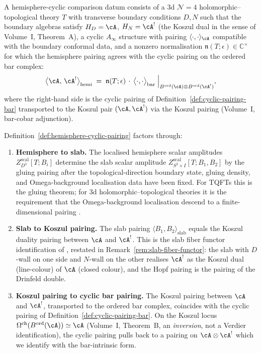 \begin{definition}
\label{def:hemisphere-cyclic-pairing}
A hemisphere-cyclic comparison datum consists of a $3$d
$\mathcal N=4$ holomorphic--topological theory \(T\)
with transverse boundary conditions $D,N$ such that the boundary
algebras satisfy $H_D = \cA$, $H_N = \cA^!$ (the Koszul dual in
the sense of Volume~I, Theorem~A), a
cyclic $A_\infty$ structure with pairing
$\langle\cdot,\cdot\rangle_\cA$ compatible with the boundary
conformal data, and a
nonzero normalisation $\mathfrak n(T;\epsilon)\in\mathbb C^\times$
for which the hemisphere pairing agrees with the cyclic pairing on
the ordered bar complex:
\[
 \bigl\langle \cA,\, \cA^!\bigr\rangle_{\mathrm{hemi}}
 \;=\;
 \mathfrak n(T;\epsilon)\,\cdot\,
 \bigl\langle\cdot,\cdot\bigr\rangle_{\mathrm{bar}}
 \;\Big|_{B^{\mathrm{ord}}(\cA)\otimes
 B^{\mathrm{ord}}(\cA^!)},
\]
where the right-hand side is the cyclic pairing of
Definition~\ref{def:cyclic-pairing-bar} transported to the
Koszul pair $(\cA, \cA^!)$ via the Koszul pairing
(Volume~I, bar-cobar adjunction).
\end{definition}

\begin{remark}
\label{rem:three-stage-identification}
Definition~\ref{def:hemisphere-cyclic-pairing} factors through:
\begin{enumerate}[leftmargin=2em,label=(\roman*)]
\item \textbf{Hemisphere to slab.} The localised hemisphere scalar
amplitudes $Z_{D^3}^{\mathrm{scal}}[T;B_i]$ determine the slab
scalar amplitude
$Z_{S^2\times I}^{\mathrm{scal}}[T;B_1,B_2]$ by the gluing
pairing after the topological-direction boundary state, gluing
density, and Omega-background localisation data have been fixed.
For TQFTs this is the gluing theorem; for $3$d
holomorphic--topological theories it is the requirement that the
Omega-background localisation descend to a finite-dimensional
pairing \cite{DFPY16}.
\item \textbf{Slab to Koszul pairing.} The slab pairing
$\langle B_1, B_2\rangle_{\mathrm{slab}}$ equals the Koszul
duality pairing between $\cA$ and $\cA^!$. This is the slab
fiber functor identification of \cite{Dimofte25}, restated in
Remark~\ref{rem:slab-fiber-functor}: the slab with $D$-wall on
one side and $N$-wall on the other realises $\cA^!$ as the Koszul
dual (line-colour) of $\cA$ (closed colour), and the Hopf pairing
is the pairing of the Drinfeld double.
\item \textbf{Koszul pairing to cyclic bar pairing.} The Koszul
pairing between $\cA$ and $\cA^!$, transported to the ordered
bar complex, coincides with the cyclic pairing of
Definition~\ref{def:cyclic-pairing-bar}. On the Koszul locus
$\Omega^{\mathrm{ch}}(B^{\mathrm{ord}}(\cA))\simeq \cA$
(Volume~I, Theorem~B, an \emph{inversion}, not a Verdier
identification), the cyclic pairing pulls back to a pairing on
$\cA\otimes \cA^!$ which we identify with the bar-intrinsic
form.
\end{enumerate}
\end{remark}

